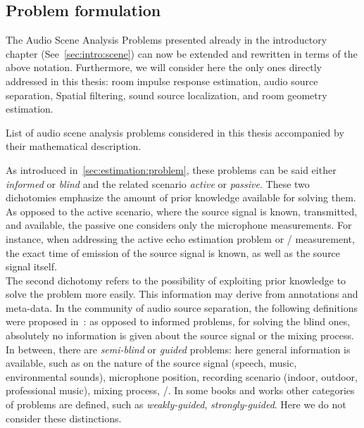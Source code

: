 \newcommand{\setMicSignals}{\ensuremath{\set{\mic_{\idxMic}}_\idxMic}}
\newcommand{\setSrcSignals}{\ensuremath{\set{\src_{\idxSrc}}_\idxSrc}}
\newcommand{\setSrcPositions}{\ensuremath{\set{\positionSource_{\idxSrc}}_\idxSrc}}
\newcommand{\setFltSignals}{\ensuremath{\set{\flt_{\idxMicSrc}(\positionMicrophone_{\idxMic} | \positionSource_{\idxSrc})}_{\idxMicSrc}}}


\subsection{Problem formulation}
The Audio Scene Analysis Problems presented already in the introductory chapter (See~\cref{sec:intro:scene}) can now be extended and rewritten in terms of the above notation.
Furthermore, we will consider here the only ones directly addressed in this thesis: room impulse response estimation, audio source separation, Spatial filtering, sound source localization, and room geometry estimation.

\begin{table}[!h]

    \begin{fullwidth}
    \centering
    \small
    \renewcommand{\arraystretch}{1.3}

    
    \caption{List of audio scene analysis problems considered in this thesis accompanied by their mathematical description.}
    \label{tab:processing:problems}

    \end{fullwidth}

\end{table}

\mynewline
As introduced in~\cref{sec:estimation:problem}, these problems can be said either \textit{informed} or \textit{blind} and the related scenario \textit{active} or \textit{passive}.
These two dichotomies emphasize the amount of prior knowledge available for solving them.
As opposed to the active scenario, where the source signal is known, transmitted, and available, the passive one considers only the microphone measurements.
For instance, when addressing the active echo estimation problem or \RIR/ measurement, the exact time of emission of the source signal is known, as well as the source signal itself.
\\The second dichotomy refers to the possibility of exploiting prior knowledge to solve the problem more easily.
This information may derive from annotations and meta-data.
In the community of audio source separation, the following definitions were proposed in~:
as opposed to informed problems, for solving the blind ones, absolutely no information is given about the source signal or the mixing process.
In between, there are \textit{semi-blind} or \textit{guided} problems:
here general information is available, such as on the nature of the source signal (speech, music, environmental sounds),
microphone position, recording scenario (indoor, outdoor, professional music), mixing process, \etc/.
In some books and works other categories of problems are defined, such as \emph{weakly-guided}, \emph{strongly-guided}.
Here we do not consider these distinctions.

